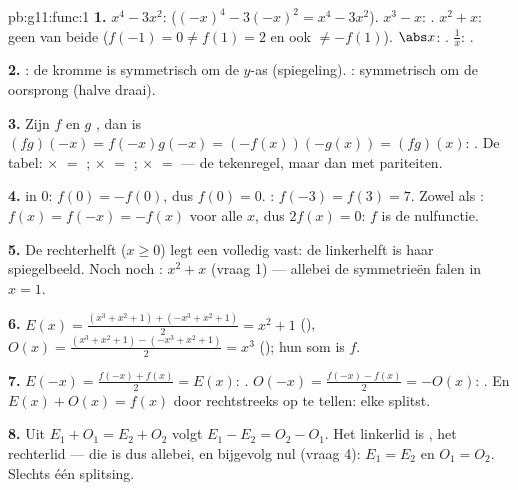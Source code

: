 \begin{solution}{pb:g11:func:1}
\textbf{1.} $x^4 - 3x^2$:  ($(-x)^4 - 3(-x)^2 = x^4 - 3x^2$).
$x^3 - x$: . $x^2 + x$: geen van beide ($f(-1) = 0 \neq f(1) = 2$ en
ook $\neq -f(1)$). $\abs x$: . $\frac1x$: .

\textbf{2.} : de kromme is symmetrisch om de $y$-as (spiegeling).
: symmetrisch om de oorsprong (halve draai).

\textbf{3.} Zijn $f$ en $g$ , dan is
$(fg)(-x) = f(-x)g(-x) = (-f(x))(-g(x)) = (fg)(x)$: . De tabel: 
$\times$  $=$ ;  $\times$  $=$ ;  $\times$
 $=$  --- de tekenregel, maar dan met pariteiten.

\textbf{4.}  in $0$: $f(0) = -f(0)$, dus $f(0) = 0$. :
$f(-3) = f(3) = 7$. Zowel  als : $f(x) = f(-x) = -f(x)$ voor alle
$x$, dus $2f(x) = 0$: $f$ is de nulfunctie.

\textbf{5.} De rechterhelft ($x \geq 0$) legt een  volledig
vast: de linkerhelft is haar spiegelbeeld. Noch  noch :
$x^2 + x$ (vraag 1) --- allebei de symmetrieën falen in $x = 1$.

\textbf{6.} $E(x) = \frac{(x^3 + x^2 + 1) + (-x^3 + x^2 + 1)}{2} = x^2 + 1$
(), $O(x) = \frac{(x^3 + x^2 + 1) - (-x^3 + x^2 + 1)}{2} = x^3$
(); hun som is $f$.

\textbf{7.} $E(-x) = \frac{f(-x) + f(x)}{2} = E(x)$: .
$O(-x) = \frac{f(-x) - f(x)}{2} = -O(x)$: . En
$E(x) + O(x) = f(x)$ door rechtstreeks op te tellen: elke  splitst.

\textbf{8.} Uit $E_1 + O_1 = E_2 + O_2$ volgt $E_1 - E_2 = O_2 - O_1$. Het
linkerlid is , het rechterlid  --- die  is dus allebei, en
bijgevolg nul (vraag 4): $E_1 = E_2$ en $O_1 = O_2$. Slechts één splitsing.


\end{solution}
